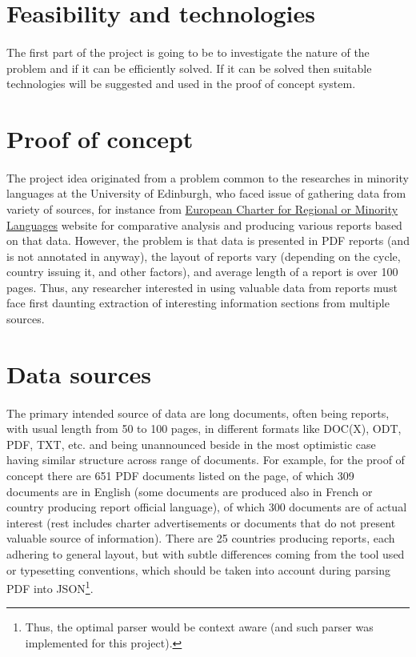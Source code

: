 \documentclass{tufte-book}
\begin{document}
\section{Feasibility and technologies}
\paragraph{}
The first part of the project is going to be to investigate the nature of the problem and if it can be efficiently solved. If it can be solved then suitable technologies will be suggested and used in the proof of concept system.

\section{Proof of concept}
\paragraph{}
The project idea originated from a problem common to the researches in minority languages at the University of Edinburgh, who faced issue of gathering data from variety of sources, for instance from \href{http://www.coe.int/t/dg4/education/minlang/Report/default_en.asp}{European Charter for Regional or Minority Languages} website for comparative analysis and producing various reports based on that data. However, the problem is that data is presented in PDF reports (and is not annotated in anyway), the layout of reports vary (depending on the cycle, country issuing it, and other factors), and average length of a report is over 100 pages. Thus, any researcher interested in using valuable data from reports must face first daunting extraction of interesting information sections from multiple sources.

\section{Data sources}
\paragraph{}
The primary intended source of data are long documents, often being reports, with usual length from 50 to 100 pages, in different formats like DOC(X), ODT, PDF, TXT, etc. and being unannounced beside in the most optimistic case having similar structure across range of documents. For example, for the proof of concept there are 651 PDF documents listed on the page, of which 309 documents are in English (some documents are produced also in French or country producing report official language), of which 300 documents are of actual interest (rest includes charter advertisements or documents that do not present valuable source of information). There are 25 countries producing reports, each adhering to general layout, but with subtle differences coming from the tool used or typesetting conventions, which should be taken into account during parsing PDF into JSON\footnote{Thus, the optimal parser would be context aware (and such parser was implemented for this project).}.
\end{document}
